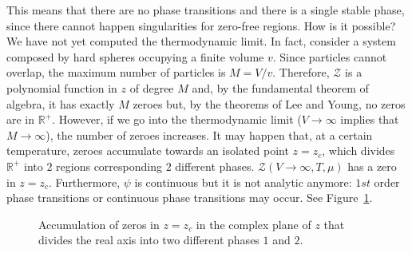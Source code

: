     This means that there are no phase transitions and there is a single stable phase, since there cannot happen singularities for zero-free regions. How is it possible? We have not yet computed the thermodynamic limit. In fact, consider a system composed by hard spheres occupying a finite volume $v$. Since particles cannot overlap, the maximum number of particles is $M = V / v$. Therefore, $\mathcal Z$ is a polynomial function in $z$ of degree $M$ and, by the fundamental theorem of algebra, it has exactly $M$ zeroes but, by the theorems of Lee and Young, no zeros are in $\mathbb R^+$. However, if we go into the thermodynamic limit ($V \rightarrow \infty$ implies that $M \rightarrow \infty$), the number of zeroes increases. It may happen that, at a certain temperature, zeroes accumulate towards an isolated point $z = z_c$, which divides $\mathbb R^+$ into $2$ regions corresponding $2$ different phases. $\mathcal Z (V \rightarrow \infty, T, \mu)$ has a zero in $z = z_c$. Furthermore, $\psi$ is continuous but it is not analytic anymore: $1st$ order phase transitions or continuous phase transitions may occur. See Figure~\ref{fig:accu}.
    
    \begin{figure}[h!]
        \centering
        \caption{Accumulation of zeros in $z = z_c$ in the complex plane of $z$ that divides the real axis into two different phases $1$ and $2$.}
        \label{fig:accu}
    \end{figure}


